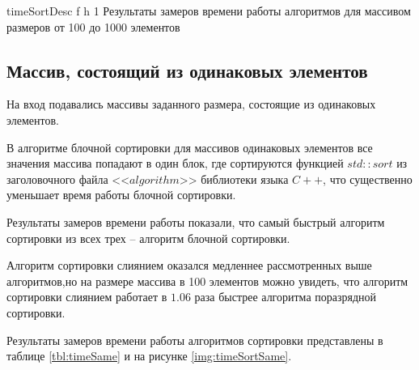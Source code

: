 \clearpage

{timeSortDesc} %
{f} %
{h} %
{1\textwidth} %
{Результаты замеров времени работы алгоритмов для массивом размеров от 100 до 1000 элементов} %

\subsection{Массив, состоящий из одинаковых элементов}

На вход подавались массивы заданного размера, состоящие из одинаковых элементов.

В алгоритме блочной сортировки  для массивов одинаковых элементов все значения массива попадают в один блок, где сортируются функцией $std::sort$ из заголовочного файла <<$algorithm$>> библиотеки языка $C++$, что существенно уменьшает время работы блочной сортировки.

Результаты замеров времени работы показали, что самый быстрый алгоритм сортировки из всех трех -- алгоритм блочной сортировки. 

Алгоритм сортировки слиянием оказался медленнее рассмотренных выше алгоритмов,но на размере массива в 100 элементов можно увидеть, что алгоритм сортировки слиянием работает в $1.06$ раза быстрее алгоритма поразрядной сортировки.

Результаты замеров времени работы алгоритмов сортировки представлены в таблице \ref{tbl:timeSame} и на рисунке \ref{img:timeSortSame}.


